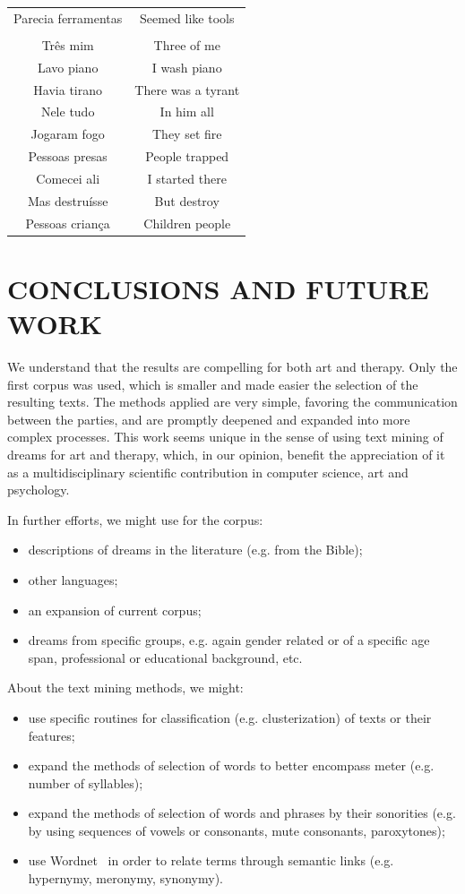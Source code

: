 \documentclass[12pt,fleqn]{article}
\begin{document}
\begin{table}[H]
\begin{tabular}{  c | c }
	Parecia ferramentas              & Seemed like tools                             \\
  & \\
	Três mim          & Three of me \\
	Lavo piano         & I wash piano \\
	Havia tirano & There was a tyrant \\
	Nele tudo & In him all \\
	Jogaram fogo & They set fire \\
	Pessoas presas &  People trapped \\
	Comecei ali & I started there \\
	Mas destruísse & But destroy \\
	Pessoas criança & Children people
\end{tabular}
\end{table}

\newpage %

\section{CONCLUSIONS AND FUTURE WORK}\label{sec:conc}
We understand that the results are compelling for both art and therapy.
Only the first corpus was used, which is smaller and made easier the selection of the resulting texts.
The methods applied are very simple, favoring the communication between the parties,
and are promptly deepened and expanded into more complex processes.
This work seems unique in the sense of using text mining of dreams for art and therapy,
which, in our opinion, benefit the appreciation of it as a multidisciplinary scientific contribution
in computer science, art and psychology.

In further efforts,
we might use for the corpus:
\begin{itemize}
	\item descriptions of dreams in the literature (e.g. from the Bible);
	\item other languages;
	\item an expansion of current corpus;
	\item dreams from specific groups, e.g. again gender related or of a specific age span, professional or educational background, etc.
\end{itemize}

\noindent About the text mining methods, we might:
\begin{itemize}
	\item use specific routines for classification (e.g. clusterization) of texts or their features;
	\item expand the methods of selection of words to better encompass meter (e.g. number of syllables);
	\item expand the methods of selection of words and phrases by their sonorities (e.g. by using sequences of vowels or consonants, mute consonants, paroxytones);
	\item use Wordnet~\citep{wordnet} in order to relate terms through semantic links (e.g. hypernymy, meronymy, synonymy).
\end{itemize}
\end{document}

